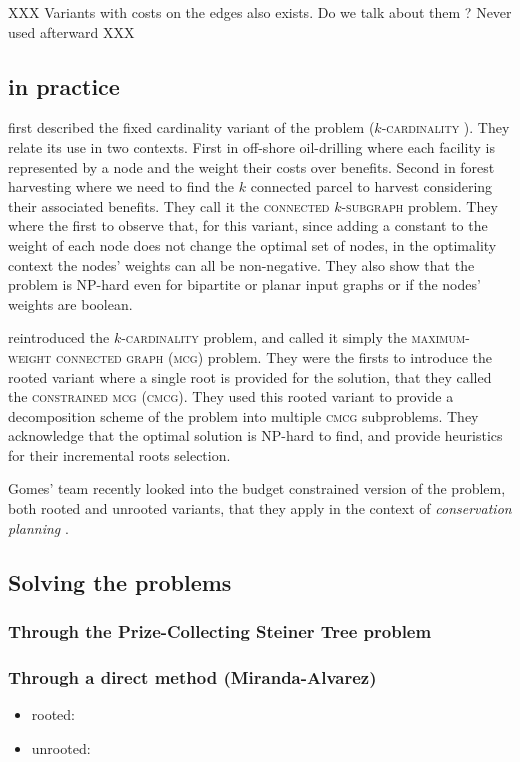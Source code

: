 	XXX Variants with costs on the edges also exists. Do we talk about them ? Never used afterward XXX

	\subsection{\mwcs{} in practice}

		\Textcite{hochbaum1994node} first described the fixed cardinality variant of the problem (\textsc{$k$-cardinality \mwcs{}}).
		They relate its use in two contexts.
		First in off-shore oil-drilling where each facility is represented by a node and the weight their costs over benefits.
		Second in forest harvesting where we need to find the $k$ connected parcel to harvest considering their associated benefits.
		They call it the \textsc{connected $k$-subgraph} problem.
		They where the first to observe that, for this variant, since adding a constant to the weight of each node does not change the optimal set of nodes, in the optimality context the nodes' weights can all be non-negative.
		They also show that the problem is NP-hard even for bipartite or planar input graphs or if the nodes' weights are boolean.

		\Textcite{lee1998decomposition} reintroduced the \textsc{$k$-cardinality \mwcs{}} problem, and called it simply the \textsc{maximum-weight connected graph} (\textsc{mcg}) problem.
		They were the firsts to introduce the rooted variant where a single root is provided for the solution, that they called the \textsc{constrained mcg} (\textsc{cmcg}).
		They used this rooted variant to provide a decomposition scheme of the \mwcs{} problem into multiple \textsc{cmcg} subproblems.
		They acknowledge that the optimal solution is NP-hard to find, and provide heuristics for their incremental roots selection.

		Gomes' team recently looked into the budget constrained version of the problem, both rooted and unrooted variants, that they apply in the context of \emph{conservation planning} \parencites{conrad2007connections}{gomes2008connections}{dilkina2010solving}.

	\subsection{Solving the \mwcs{} problems}
	\label{subsec:solvingmwcs}

	\subsubsection{Through the Prize-Collecting Steiner Tree problem}

	\subsubsection{Through a direct method (Miranda-Alvarez)}

		\begin{itemize}
			\item rooted: \cite{alvarez2013rooted}
			\item unrooted: \cite{alvarez2013maximum}
		\end{itemize}
